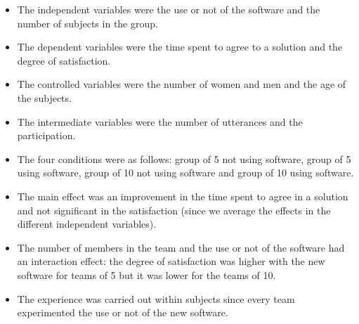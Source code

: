 \begin{itemize}
\item The independent variables were the use or not of the software and the number of subjects in the group. 
\item The dependent variables were the time spent to agree to a solution and the degree of satisfaction.
\item The controlled variables were the number of women and men and the age of the subjects.
\item The intermediate variables were the number of utterances and the participation.
\item The four conditions were as follows: group of 5 not using software, group of 5 using software, group of 10 not using software and group of 10 using software.
\item The main effect was an improvement in the time spent to agree in a solution and not significant in the satisfaction (since we average the effects in the different independent variables).
\item The number of members in the team and the use or not of the software had an interaction effect: the degree of satisfaction was higher with the new software for teams of 5 but it was lower for the teams of 10.
\item The experience was carried out within subjects since every team experimented the use or not of the new software.
\end{itemize}

\begin{figure}[H]
\centering
{}
\end{figure}
































